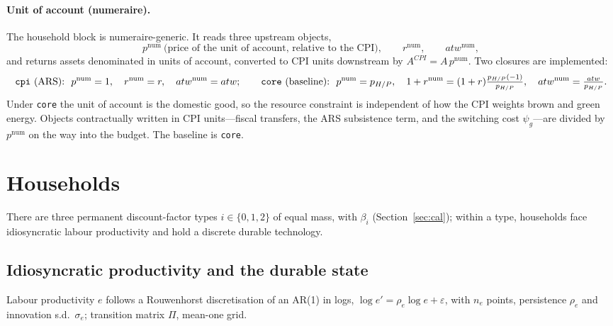 \documentclass[11pt]{article}
\newcommand{\num}{\mathrm{num}}
\begin{document}
\paragraph{Unit of account (numeraire).} The household block is
numeraire-generic. It reads three upstream objects,
\begin{equation}
p^{\num}\ \text{(price of the unit of account, relative to the CPI)},\qquad
r^{\num},\qquad atw^{\num},
\end{equation}
and returns assets denominated in units of account, converted to CPI units
downstream by $A^{CPI}=A\,p^{\num}$. Two closures are implemented:
\begin{equation}
\text{\texttt{cpi} (ARS):}\ \ p^{\num}=1,\quad r^{\num}=r,\quad atw^{\num}=atw;
\qquad
\text{\texttt{core} (baseline):}\ \ p^{\num}=p_{H/P},\quad
1+r^{\num}=(1+r)\tfrac{p_{H/P}(-1)}{p_{H/P}},\quad atw^{\num}=\tfrac{atw}{p_{H/P}} .
\end{equation}
Under \texttt{core} the unit of account is the domestic good, so the resource
constraint is independent of how the CPI weights brown and green energy. Objects
contractually written in CPI units---fiscal transfers, the ARS subsistence term,
and the switching cost $\psi_g$---are divided by $p^{\num}$ on the way into the
budget. The baseline is \texttt{core}.

\section{Households}\label{sec:hh}

There are three permanent discount-factor types $i\in\{0,1,2\}$ of equal mass,
with $\beta_i$ (Section~\ref{sec:cal}); within a type, households face
idiosyncratic labour productivity and hold a discrete durable technology.

\subsection{Idiosyncratic productivity and the durable state}

Labour productivity $e$ follows a Rouwenhorst discretisation of an AR(1) in
logs, $\log e' = \rho_e \log e + \varepsilon$, with $n_e$ points, persistence
$\rho_e$ and innovation s.d.\ $\sigma_e$; transition matrix $\Pi$, mean-one grid.
\end{document}
